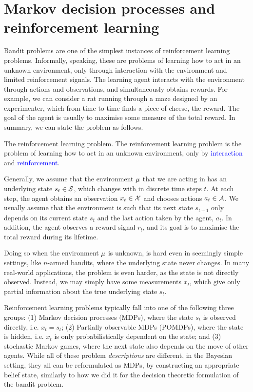 \section{Markov decision processes and reinforcement learning}
\label{sec:MDP}
Bandit problems are one of the simplest instances of reinforcement learning problems. Informally, speaking, these are problems of learning how to act in an unknown environment, only through interaction with the environment and limited reinforcement signals.
The learning agent interacts with the environment through actions and observations, and simultaneously obtains rewards. For example, we can consider a rat running through a maze designed by an experimenter, which from time to time finds a piece of cheese, the reward. 
The goal of the agent is usually to maximise some measure of the total reward. In summary, we can state the problem as follows.
\begin{block}{The reinforcement learning problem.}
  The reinforcement learning problem is the problem of \alert{learning} how to act in an \alert{unknown} environment, only by \textcolor{blue}{interaction} and \textcolor{blue}{reinforcement}.
\end{block}
Generally, we assume that the environment $\mu$ that we are acting in
has an underlying state $s_t \in {\mathcal{S}}$, which changes with in discrete
time steps $t$. At each step, the agent obtains an observation $x_t \in
{\mathcal{X}}$ and chooses actions $a_t \in {\mathcal{A}}$. We usually assume that the
environment is such that its next state $s_{t+1}$ only depends on its
current state $s_t$ and the last action taken by the agent, $a_t$. In
addition, the agent observes a reward signal $r_t$, and its goal is to
maximise the total reward during its lifetime.

Doing so when the environment $\mu$ is unknown, is hard even in
seemingly simple settings, like $n$-armed bandits, where the
underlying state never changes. In many real-world applications, the
problem is even harder, as the state is not directly
observed. Instead, we may simply have some measurements $x_t$, which
give only partial information about the true underlying state $s_t$.

Reinforcement learning problems typically fall into one of the
following three groups: (1) Markov decision processes (MDPs), where
the state $s_t$ is observed directly, i.e. $x_t = s_t$; (2) Partially
observable MDPs (POMDPs), where the state is hidden, i.e. $x_t$ is
only probabilistically dependent on the state; and (3) stochastic
Markov games, where the next state also depends on the move of other
agents. While all of these problem \emph{descriptions} are different,
in the Bayesian setting, they all can be reformulated as MDPs, by
constructing an appropriate belief state, similarly to how we did it
for the decision theoretic formulation of the bandit problem.


